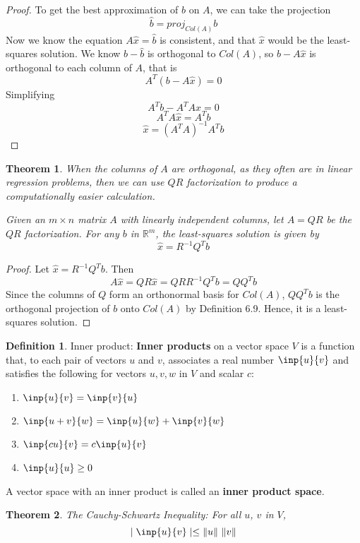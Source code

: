 \documentclass[letterpaper]{article}
\newtheorem{theorem}{Theorem}
\theoremstyle{definition}
\newtheorem{definition}{Definition}[section]
\DeclarePairedDelimiter{\norm}{\lVert}{\rVert}
\begin{document}
\begin{proof}
To get the best approximation of $b$ on $A$, we can take the projection 
$$\hat{b} = proj_{Col(A)} b$$
Now we know the equation $A\hat{x} = \hat{b}$ is consistent, and that $\hat{x}$ would be the least-squares solution. We know $b - \hat{b}$ is orthogonal to $Col(A)$, so $b - A\hat{x}$ is orthogonal to each column of $A$, that is 
$$A^{T} (b - A\hat{x}) = 0$$
Simplifying 
$$A^{T}b - A^{T}A\hat{x} = 0$$
$$A^{T}A\hat{x} = A^{T}b$$
$$\hat{x} = (A^{T}A)^{-1} A^{T} b$$
\end{proof}

\begin{theorem}
When the columns of $A$ are orthogonal, as they often are in linear regression problems, then we can use $QR$ factorization to produce a computationally easier calculation. 

Given an $m \times n$ matrix $A$ with linearly independent columns, let $A = QR$ be the $QR$ factorization. For any $b$ in $\mathbb{R}^m$, the least-squares solution is given by 
$$\hat{x} = R^{-1}Q^{T}b$$
\end{theorem}

\begin{proof}
Let $\hat{x} = R^{-1}Q^{T}b$. Then 
$$A\hat{x} = QR\hat{x} = QRR^{-1}Q^{T}b = QQ^{T}b$$
Since the columns of $Q$ form an orthonormal basis for $Col(A)$, $QQ^{T}b$ is the orthogonal projection of $b$ onto $Col(A)$ by Definition 6.9. Hence, it is a least-squares solution. 
\end{proof}

\begin{definition}{Inner product: }
\textbf{Inner products} on a vector space $V$ is a function that, to each pair of vectors $u$ and $v$, associates a real number $\inp{u}{v}$ and satisfies the following for vectors $u, v, w$ in $V$ and scalar $c$:
\begin{enumerate}
	\item $\inp{u}{v} = \inp{v}{u}$
	\item $\inp{u + v}{w} = \inp{u}{w} + \inp{v}{w}$
	\item $\inp{cu}{v} = c\inp{u}{v}$
	\item $\inp{u}{u} \geq 0$
\end{enumerate}
A vector space with an inner product is called an \textbf{inner product space}. 
\end{definition}

\begin{theorem}{The Cauchy-Schwartz Inequality: }
For all $u$, $v$ in $V$, 
$$\mid \inp{u}{v} \mid \leq \norm{u} \ \norm{v}$$
\end{theorem}
\end{document}
